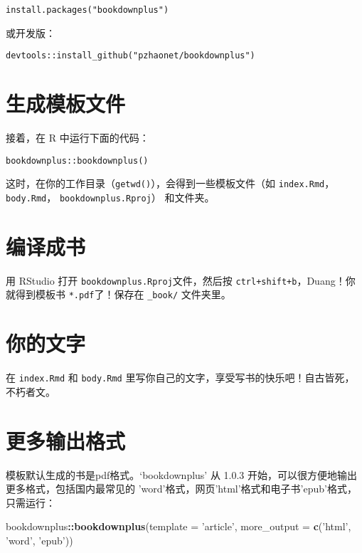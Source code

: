 \documentclass[singlesided]{Style/ucasthesis}%
\newenvironment{Shaded}{\begin{snugshade}}{\end{snugshade}}
\newcommand{\KeywordTok}[1]{\textcolor[rgb]{0.13,0.29,0.53}{\textbf{{#1}}}}
\newcommand{\DataTypeTok}[1]{\textcolor[rgb]{0.13,0.29,0.53}{{#1}}}
\newcommand{\StringTok}[1]{\textcolor[rgb]{0.31,0.60,0.02}{{#1}}}
\newcommand{\OperatorTok}[1]{\textcolor[rgb]{0.81,0.36,0.00}{\textbf{{#1}}}}
\newcommand{\NormalTok}[1]{{#1}}
\begin{document}
\begin{verbatim}
install.packages("bookdownplus")
\end{verbatim}

或开发版：

\begin{verbatim}
devtools::install_github("pzhaonet/bookdownplus")
\end{verbatim}

\hypertarget{section-4}{%
\section{生成模板文件}\label{section-4}}

接着，在 R 中运行下面的代码：

\begin{verbatim}
bookdownplus::bookdownplus()
\end{verbatim}

这时，在你的工作目录（\texttt{getwd()}），会得到一些模板文件（如 \texttt{index.Rmd}，\texttt{body.Rmd}， \texttt{bookdownplus.Rproj}） 和文件夹。

\hypertarget{section-5}{%
\section{编译成书}\label{section-5}}

用 RStudio 打开 \texttt{bookdownplus.Rproj}文件，然后按 \texttt{ctrl+shift+b}，Duang！你就得到模板书 \texttt{*.pdf}了！保存在 \texttt{\_book/} 文件夹里。

\hypertarget{section-6}{%
\section{你的文字}\label{section-6}}

在 \texttt{index.Rmd} 和 \texttt{body.Rmd} 里写你自己的文字，享受写书的快乐吧！自古皆死，不朽者文。

\hypertarget{section-7}{%
\section{更多输出格式}\label{section-7}}

模板默认生成的书是pdf格式。`bookdownplus' 从 1.0.3 开始，可以很方便地输出更多格式，包括国内最常见的 'word'格式，网页'html'格式和电子书'epub'格式，只需运行：

\begin{Shaded}
\begin{Highlighting}[]
\NormalTok{bookdownplus}\OperatorTok{::}\KeywordTok{bookdownplus}\NormalTok{(}\DataTypeTok{template =} \StringTok{'article'}\NormalTok{, }
    \DataTypeTok{more_output =} \KeywordTok{c}\NormalTok{(}\StringTok{'html'}\NormalTok{, }\StringTok{'word'}\NormalTok{, }\StringTok{'epub'}\NormalTok{))}
\end{Highlighting}
\end{Shaded}
\end{document}

